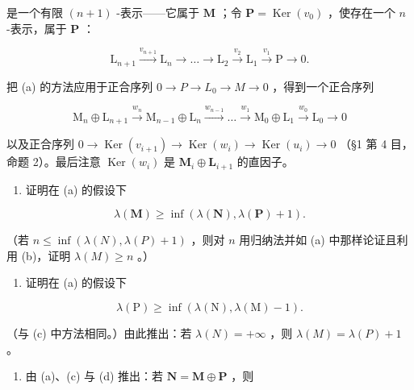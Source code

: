 是一个有限 \((n + 1)\) -表示——它属于 \(\mathbf{M}\) ；令 \(\mathbf{P} = \operatorname{Ker}(v_0)\) ，使存在一个 \(n\) -表示，属于 \(\mathbf{P}\) ：

\[
\mathrm{L} _ {n + 1} \xrightarrow {v _ {n + 1}} \mathrm{L} _ {n} \longrightarrow \dots \longrightarrow \mathrm{L} _ {2} \xrightarrow {v _ {2}} \mathrm{L} _ {1} \xrightarrow {v _ {1}} \mathrm{P} \longrightarrow 0.
\]

把 (a) 的方法应用于正合序列 \(0 \rightarrow P \rightarrow L_{0} \rightarrow M \rightarrow 0\) ，得到一个正合序列

\[
\mathrm{M} _ {n} \oplus \mathrm{L} _ {n + 1} \xrightarrow {w _ {n}} \mathrm{M} _ {n - 1} \oplus \mathrm{L} _ {n} \xrightarrow {w _ {n - 1}} \dots \xrightarrow {w _ {1}} \mathrm{M} _ {0} \oplus \mathrm{L} _ {1} \xrightarrow {w _ {0}} \mathrm{L} _ {0} \longrightarrow 0
\]

以及正合序列 \(0 \to \operatorname{Ker}(v_{i+1}) \to \operatorname{Ker}(w_i) \to \operatorname{Ker}(u_i) \to 0\) （§1 第 4 目，命题 2）。最后注意 \(\operatorname{Ker}(w_i)\) 是 \(\mathbf{M}_i \oplus \mathbf{L}_{i+1}\) 的直因子。

\begin{enumerate}
\def\labelenumi{(\alph{enumi})}
\setcounter{enumi}{2}
\tightlist
\item
  证明在 (a) 的假设下
\end{enumerate}

\[
\lambda (\mathbf {M}) \geqslant \inf (\lambda (\mathbf {N}), \lambda (\mathbf {P}) + 1).
\]

（若 \(n \leqslant \inf(\lambda(N), \lambda(P) + 1)\) ，则对 \(n\) 用归纳法并如 (a) 中那样论证且利用 (b)，证明 \(\lambda(M) \geqslant n\) 。）

\begin{enumerate}
\def\labelenumi{(\alph{enumi})}
\setcounter{enumi}{3}
\tightlist
\item
  证明在 (a) 的假设下
\end{enumerate}

\[
\lambda (\mathrm{P}) \geqslant \inf (\lambda (\mathrm{N}), \lambda (\mathrm{M}) - 1).
\]

（与 (c) 中方法相同。）由此推出：若 \(\lambda(N) = +\infty\) ，则 \(\lambda(M) = \lambda(P) + 1\) 。

\begin{enumerate}
\def\labelenumi{(\alph{enumi})}
\setcounter{enumi}{4}
\tightlist
\item
  由 (a)、(c) 与 (d) 推出：若 \(\mathbf{N} = \mathbf{M} \oplus \mathbf{P}\) ，则
\end{enumerate}

